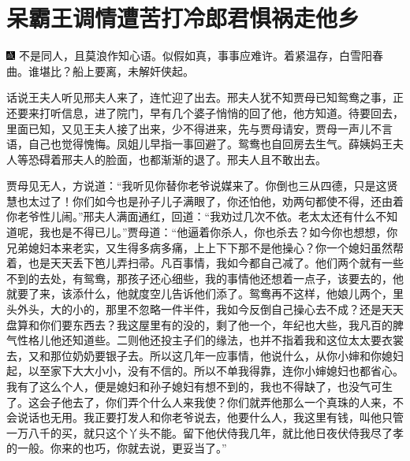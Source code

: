 

\chapter{呆霸王调情遭苦打\hspace{.5em}冷郎君惧祸走他乡}

{\includegraphics[width=3mm]{../Images/00005}  \kaishu 不是同人，且莫浪作知心语。似假如真，事事应难许。着紧温存，白雪阳春曲。谁堪比？船上要离，未解奸侠起。}

话说王夫人听见邢夫人来了，连忙迎了出去。邢夫人犹不知贾母已知鸳鸯之事，正还要来打听信息，进了院门，早有几个婆子悄悄的回了他，他方知道。待要回去，里面已知，又见王夫人接了出来，少不得进来，先与贾母请安，贾母一声儿不言语，自己也觉得愧悔。凤姐儿早指一事回避了。鸳鸯也自回房去生气。薛姨妈王夫人等恐碍着邢夫人的脸面，也都渐渐的退了。邢夫人且不敢出去。

贾母见无人，方说道：``我听见你替你老爷说媒来了。你倒也三从四德，只是这贤慧也太过了！你们如今也是孙子儿子满眼了，你还怕他，劝两句都使不得，还由着你老爷性儿闹。''邢夫人满面通红，回道：``我劝过几次不依。老太太还有什么不知道呢，我也是不得已儿。''贾母道：``他逼着你杀人，你也杀去？如今你也想想，你兄弟媳妇本来老实，又生得多病多痛，上上下下那不是他操心？你一个媳妇虽然帮着，也是天天丢下笆儿弄扫帚。凡百事情，我如今都自己减了。他们两个就有一些不到的去处，有鸳鸯，那孩子还心细些，我的事情他还想着一点子，该要去的，他就要了来，该添什么，他就度空儿告诉他们添了。鸳鸯再不这样，他娘儿两个，里头外头，大的小的，那里不忽略一件半件，我如今反倒自己操心去不成？还是天天盘算和你们要东西去？我这屋里有的没的，剩了他一个，年纪也大些，我凡百的脾气性格儿他还知道些。二则他还投主子们的缘法，也并不指着我和这位太太要衣裳去，又和那位奶奶要银子去。所以这几年一应事情，他说什么，从你小婶和你媳妇起，以至家下大大小小，没有不信的。所以不单我得靠，连你小婶媳妇也都省心。我有了这么个人，便是媳妇和孙子媳妇有想不到的，我也不得缺了，也没气可生了。这会子他去了，你们弄个什么人来我使？你们就弄他那么一个真珠的人来，不会说话也无用。我正要打发人和你老爷说去，他要什么人，我这里有钱，叫他只管一万八千的买，就只这个丫头不能。留下他伏侍我几年，就比他日夜伏侍我尽了孝的一般。你来的也巧，你就去说，更妥当了。''

